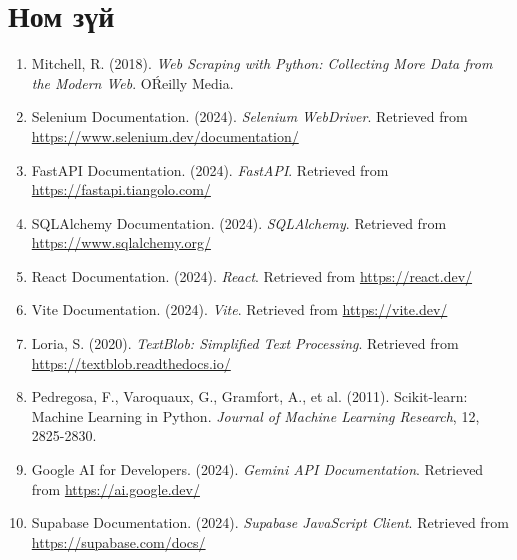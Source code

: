 \documentclass[
12pt,
oneside,
english,
onehalfspacing,
nolistspacing,
headsepline,
]{MUST-Thesis}
\begin{document}
\chapter*{Ном зүй}

\begin{enumerate}
    \item Mitchell, R. (2018). \textit{Web Scraping with Python: Collecting More Data from the Modern Web}. O\'Reilly Media.

    \item Selenium Documentation. (2024). \textit{Selenium WebDriver}. Retrieved from \url{https://www.selenium.dev/documentation/}

    \item FastAPI Documentation. (2024). \textit{FastAPI}. Retrieved from \url{https://fastapi.tiangolo.com/}

    \item SQLAlchemy Documentation. (2024). \textit{SQLAlchemy}. Retrieved from \url{https://www.sqlalchemy.org/}

    \item React Documentation. (2024). \textit{React}. Retrieved from \url{https://react.dev/}

    \item Vite Documentation. (2024). \textit{Vite}. Retrieved from \url{https://vite.dev/}

    \item Loria, S. (2020). \textit{TextBlob: Simplified Text Processing}. Retrieved from \url{https://textblob.readthedocs.io/}

    \item Pedregosa, F., Varoquaux, G., Gramfort, A., et al. (2011). Scikit-learn: Machine Learning in Python. \textit{Journal of Machine Learning Research}, 12, 2825-2830.

    \item Google AI for Developers. (2024). \textit{Gemini API Documentation}. Retrieved from \url{https://ai.google.dev/}

    \item Supabase Documentation. (2024). \textit{Supabase JavaScript Client}. Retrieved from \url{https://supabase.com/docs/}
\end{enumerate}

\appendix
\end{document}
